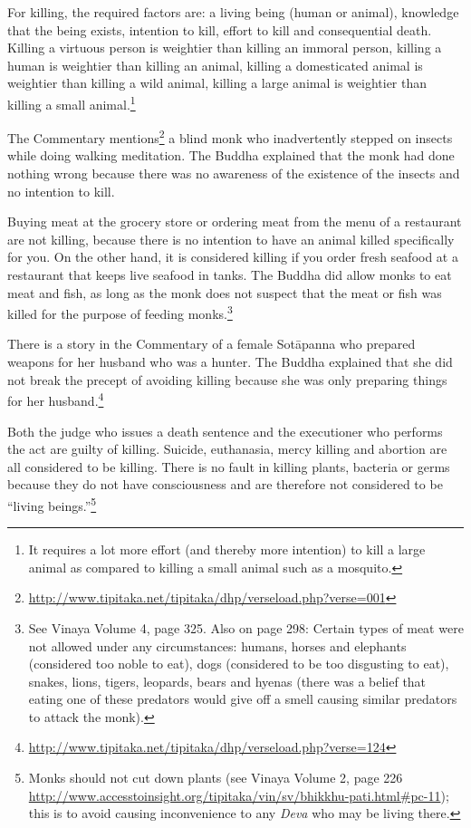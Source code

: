 For killing, the required factors are: a living being (human or animal), knowledge that the being exists, intention to kill, effort to kill and consequential death. Killing a virtuous person is weightier than killing an immoral person, killing a human is weightier than killing an animal, killing a domesticated animal is weightier than killing a wild animal, killing a large animal is weightier than killing a small animal.\footnote{It requires a lot more effort (and thereby more intention) to kill a large animal as compared to killing a small animal such as a mosquito.}

The Commentary mentions\footnote{\url{http://www.tipitaka.net/tipitaka/dhp/verseload.php?verse=001}} a blind monk who inadvertently stepped on insects while doing walking meditation. The Buddha explained that the monk had done nothing wrong because there was no awareness of the existence of the insects and no intention to kill. 

\pagebreak

Buying meat at the grocery store or ordering meat from the menu of a restaurant are not killing, because there is no intention to have an animal killed specifically for you. On the other hand, it is considered killing if you order fresh seafood at a restaurant that keeps live seafood in tanks. The Buddha did allow monks to eat meat and fish, as long as the monk does not suspect that the meat or fish was killed for the purpose of feeding monks.\footnote{See Vinaya Volume 4, page 325. Also on page 298: Certain types of meat were not allowed under any circumstances: humans, horses and elephants (considered too noble to eat), dogs (considered to be too disgusting to eat), snakes, lions, tigers, leopards, bears and hyenas (there was a belief that eating one of these predators would give off a smell causing similar predators to attack the monk).}

There is a story in the Commentary of a female Sotāpanna who prepared weapons for her husband who was a hunter. The Buddha explained that she did not break the precept of avoiding killing because she was only preparing things for her husband.\footnote{\url{http://www.tipitaka.net/tipitaka/dhp/verseload.php?verse=124}}

Both the judge who issues a death sentence and the executioner who performs the act are guilty of killing. Suicide, euthanasia, mercy killing and abortion are all considered to be killing. There is no fault in killing plants, bacteria or germs because they do not have consciousness and are therefore not considered to be “living beings.”\footnote{Monks should not cut down plants (see Vinaya Volume 2, page 226 \url{http://www.accesstoinsight.org/tipitaka/vin/sv/bhikkhu-pati.html\#pc-11}); this is to avoid causing inconvenience to any \textit{Deva} who may be living there.}

